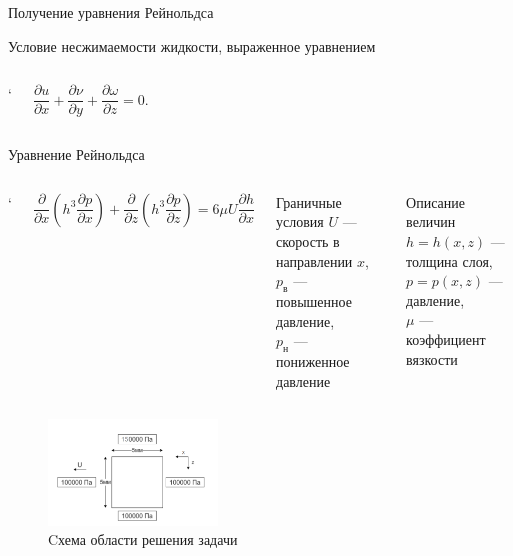 \documentclass[ignoreonframetext,unicode]{beamer}
\begin{document}
\begin{frame}{Получение уравнения Рейнольдса}
\begin{block}{Условие несжимаемости жидкости, выраженное уравнением}
\begin{columns}
			
			`
			\begin{minipage}[t]{0.2\linewidth}
				
				
				\begin{equation*}
						\frac{\partial u}{\partial x} + \frac{\partial \nu}{\partial y} + \frac{\partial \omega}{\partial z} = 0.
				\end{equation*}
		\end{minipage}
	\end{columns}
		
	\end{block}
		

	

			
			
	\end{frame}

	\begin{frame}{Уравнение Рейнольдса}
		\vspace*{-4mm}
		\begin{columns}
			\column{\textwidth}`
			\begin{block}{}
			 \[
				\frac{\partial}{\partial x} \left(h^3 \frac{\partial p}{\partial x} \right) + \frac{\partial}{\partial z} \left(h^3 \frac{\partial p}{\partial z} \right) = 6 \mu U \frac{\partial h}{\partial x}
			 \]
			\end{block}

\vspace*{-2mm}
		\begin{columns}
			\begin{block}{Граничные условия}
				$U$ --- скорость в направлении $x$,\\ 
				$p_{\text{в}}$ --- повышенное давление,\\ 
				$p_{\text{н}}$ --- пониженное давление
			\end{block}
		
			\begin{block}{Описание величин}
			$h = h(x, z)$ --- толщина слоя, \\
			$p = p(x, z)$ --- давление, \\
			$\mu$ --- коэффициент вязкости
			\end{block}
		\end{columns}

		\end{columns}
		
		\begin{figure}[!htbp]
			\centering
			\includegraphics[width=0.4\textwidth]{taskGU}%
			\caption{Cхема области решения задачи}
			\vspace*{-2mm}
			\label{ser_graph}
		\end{figure}
		

\end{frame}
\end{document}
